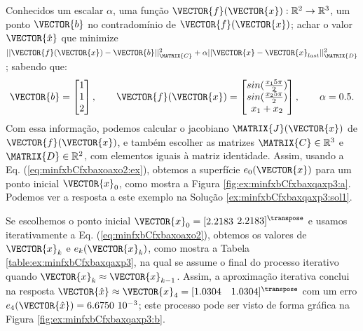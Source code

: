 \begin{example}
\label{ex:minfxbCfxbaxqaxp1}
Conhecidos um escalar $\alpha$, uma função $\VECTOR{f}(\VECTOR{x}) : \mathbb{R}^{2} \rightarrow \mathbb{R}^{3}$,
um ponto $\VECTOR{b}$ no contradomínio de $\VECTOR{f}(\VECTOR{x})$;
achar o valor $\VECTOR{\hat{x}}$ que minimize 
$||\VECTOR{f}(\VECTOR{x})-\VECTOR{b}||_{\MATRIX{C}}^2+\alpha||\VECTOR{x}-\VECTOR{x}_{last}||_{\MATRIX{D}}^2$;
sabendo que:
\begin{equation}
\VECTOR{b}=\begin{bmatrix}
1\\
1\\
2
\end{bmatrix},
\qquad 
\VECTOR{f}(\VECTOR{x})=\begin{bmatrix}
sin(\frac{x_1 5 \pi}{2})\\
sin(\frac{x_2 5 \pi}{2})\\
x_1+x_2
\end{bmatrix},
\qquad
\alpha=0.5.
\end{equation}
Com essa informação, podemos calcular o jacobiano $\MATRIX{J}(\VECTOR{x})$ de $\VECTOR{f}(\VECTOR{x})$,
 e também escolher as matrizes $\MATRIX{C} \in \mathbb{R}^{3}$ e $\MATRIX{D} \in \mathbb{R}^{2}$, 
com elementos iguais à  matriz identidade. 
Assim, usando a Eq. (\ref{eq:minfxbCfxbaxoaxo2:ex}),
obtemos a superfície $e_{0}(\VECTOR{x})$ para um ponto inicial $\VECTOR{x}_0$, 
como mostra a Figura \ref{fig:ex:minfxbCfxbaxqaxp3:a}.
Podemos ver a resposta a este exemplo na Solução \ref{ex:minfxbCfxbaxqaxp3:sol1}.
\end{example}

\begin{SolutionT}
\label{ex:minfxbCfxbaxqaxp3:sol1}
Se escolhemos o ponto inicial $\VECTOR{x}_0=[2.2183$ $2.2183]^{\transpose}$ e 
usamos iterativamente a Eq. (\ref{eq:minfxbCfxbaxoaxo2}), obtemos os valores 
de $\VECTOR{x}_k$ e $e_{k}(\VECTOR{x}_k)$, como mostra a Tabela \ref{table:ex:minfxbCfxbaxqaxp3},
na qual se assume o final do processo iterativo quando $\VECTOR{x}_k \approx \VECTOR{x}_{k-1}$.
Assim, a aproximação iterativa conclui na resposta 
$\VECTOR{\hat{x}}\approx \VECTOR{x}_{4} =[1.0304\quad 1.0304]^{\transpose}$
com um erro $e_{4}(\VECTOR{\hat{x}})=6.6750~10^{-3}$;
este processo pode ser visto de forma gráfica na Figura \ref{fig:ex:minfxbCfxbaxqaxp3:b}.
\end{SolutionT}

